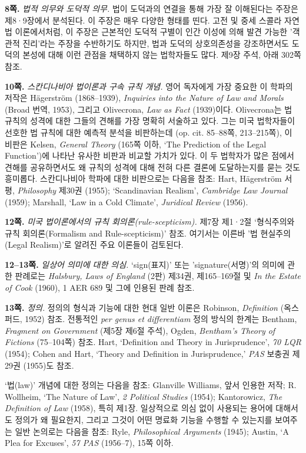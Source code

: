 \documentclass[12pt, oneside]{book}  %
\begin{document}
\textbf{8쪽.} \emph{법적 의무와 도덕적 의무.} 법이 도덕과의 연결을 통해
가장 잘 이해된다는 주장은 제8·9장에서 분석된다. 이 주장은 매우 다양한
형태를 띤다. 고전 및 중세 스콜라 자연법 이론에서처럼, 이 주장은 근본적인
도덕적 구별이 인간 이성에 의해 발견 가능한 '객관적 진리'라는 주장을
수반하기도 하지만, 법과 도덕의 상호의존성을 강조하면서도 도덕의 본성에
대해 이런 관점을 채택하지 않는 법학자들도 많다. 제9장 주석, 아래 302쪽
참조.

\textbf{10쪽.} \emph{스칸디나비아 법이론과 구속 규칙 개념.} 영어
독자에게 가장 중요한 이 학파의 저작은 Hägerström (1868--1939),
\emph{Inquiries into the Nature of Law and Morals} (Broad 번역, 1953),
그리고 Olivecrona, \emph{Law as Fact} (1939)이다. Olivecrona는 법 규칙의
성격에 대한 그들의 견해를 가장 명확히 서술하고 있다. 그는 미국
법학자들이 선호한 법 규칙에 대한 예측적 분석을 비판하는데 (op. cit.
85--88쪽, 213--215쪽), 이 비판은 Kelsen, \emph{General Theory} (165쪽
이하, `The Prediction of the Legal Function')에 나타난 유사한 비판과
비교할 가치가 있다. 이 두 법학자가 많은 점에서 견해를 공유하면서도 왜
규칙의 성격에 대해 전혀 다른 결론에 도달하는지를 묻는 것도 흥미롭다.
스칸디나비아 학파에 대한 비판으로는 다음을 참조: Hart, Hägerström 서평,
\emph{Philosophy} 제30권 (1955); `Scandinavian Realism', \emph{Cambridge
Law Journal} (1959); Marshall, `Law in a Cold Climate', \emph{Juridical
Review} (1956).

\textbf{12쪽.} \emph{미국 법이론에서의 규칙 회의론(rule-scepticism).}
제7장 제1·2절 `형식주의와 규칙 회의론(Formalism and Rule-scepticism)'
참조. 여기서는 이른바 '법 현실주의(Legal Realism)'로 알려진 주요
이론들이 검토된다.

\textbf{12--13쪽.} \emph{일상어 의미에 대한 의심.} `sign(표지)' 또는
'signature(서명)'의 의미에 관한 판례로는 \emph{Halsbury, Laws of
England} (2판) 제34권, 제165--169절 및 \emph{In the Estate of Cook}
(1960), 1 AER 689 및 그에 인용된 판례 참조.

\textbf{13쪽.} \emph{정의.} 정의의 형식과 기능에 대한 현대 일반 이론은
Robinson, \emph{Definition} (옥스퍼드, 1952) 참조. 전통적인 \emph{per
genus et differentiam} 정의 방식의 한계는 Bentham, \emph{Fragment on
Government} (제5장 제6절 주석), Ogden, \emph{Bentham's Theory of
Fictions} (75--104쪽) 참조. Hart, `Definition and Theory in
Jurisprudence', \emph{70 LQR} (1954); Cohen and Hart, `Theory and
Definition in Jurisprudence,' \emph{PAS} 보충권 제29권 (1955)도 참조.

`법(law)' 개념에 대한 정의는 다음을 참조: Glanville Williams, 앞서
인용한 저작; R. Wollheim, `The Nature of Law', \emph{2 Political
Studies} (1954); Kantorowicz, \emph{The Definition of Law} (1958), 특히
제1장. 일상적으로 의심 없이 사용되는 용어에 대해서도 정의가 왜 필요한지,
그리고 그것이 어떤 명료화 기능을 수행할 수 있는지를 보여주는 일반
논의로는 다음을 참조: Ryle, \emph{Philosophical Arguments} (1945);
Austin, `A Plea for Excuses', \emph{57 PAS} (1956--7), 15쪽 이하.
\end{document}
